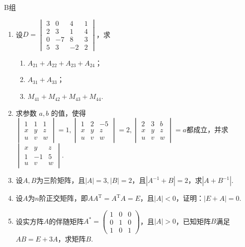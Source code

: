 \begin{enumerate}
\end{enumerate}

\centerline{\heiti B组}
\begin{enumerate}
    \item 设$D=\begin{vmatrix}
                  3 & 0 & 4 & 1 \\ 2 & 3 & 1 & 4 \\ 0 & -7 & 8 & 3 \\ 5 & 3 & -2 & 2
              \end{vmatrix}$，求
          \begin{enumerate}
              \item $A_{21}+A_{22}+A_{23}+A_{24}$；

              \item $A_{31}+A_{33}$；

              \item $M_{41}+M_{42}+M_{43}+M_{44}$.
          \end{enumerate}

    \item 求参数 $a,b$  的值，使得$\begin{vmatrix}1 & 1 & 1 \\ x & y & z \\u & v & w\end{vmatrix}=1,
              \begin{vmatrix}1 & 2 & -5 \\ x & y & z \\u & v & w\end{vmatrix}=2,
              \begin{vmatrix}2 & 3 & b \\ x & y & z \\u & v & w\end{vmatrix}=a$都成立，并求$\begin{vmatrix}x & y & z \\ 1 & -1 & 5 \\u & v & w\end{vmatrix}$.

    \item 设$A,B$为三阶矩阵，且$|A|=3,|B|=2$，且$|A^{-1}+B|=2$，求$|A+B^{-1}|$.

    \item 设$A$为$n$阶正交矩阵，即$AA^\mathrm{T}=A^\mathrm{T}A=E$，且$|A|<0$，证明：$|E+A|=0$.

    \item 设实方阵$A$的伴随矩阵$A^*=\begin{pmatrix}
        1 & 0 & 0 \\ 0 & 1 & 0 \\ 1 & 0 & 1
    \end{pmatrix}$，且$|A|>0$，已知矩阵$B$满足$AB=E+3A$，求矩阵$B$.


\end{enumerate}
